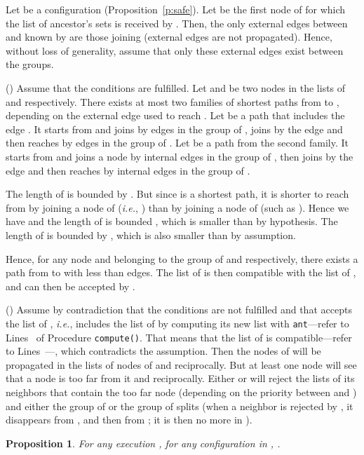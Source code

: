 \documentclass[11pt,english]{article}
\newcommand{\Latin}[1]{\textit{#1}}
\newcommand{\ie}{\Latin{i.e.},\xspace}
\newtheorem{proposition}{Proposition}
\newenvironment{proof}[1][0cm]{
  \begin{list}{\bf Proof.~}{
      \setlength{\itemindent}{0cm}
      \setlength{\labelsep}{0cm}
      \setlength{\labelwidth}{#1}
      \setlength{\leftmargin}{#1}
    \item
    }
}{\hfill
  \end{list}
}
\begin{document}
\begin{proof}
  Let  be a configuration (Proposition~\ref{p:safe}).
  Let  be the first node of  for which the list of ancestor's sets is
  received by . Then, the only external edges between  and 
  known by  are those joining  (external edges are not propagated). Hence,
  without loss of generality, assume that only these external edges exist
  between the groups.

  \noindent () Assume that the conditions are fulfilled.
Let  and  be two nodes in the lists of  and 
  respectively. There exists at most two families of shortest paths from  to
  , depending on the external edge used to reach .
Let  be a path that includes the edge . It starts from  and
  joins  by  edges in the group of , joins  by the edge  and
  then reaches  by  edges in the group of .
Let  be a path from the second family. It starts from  and joins a
  node  by  internal edges in the group of , then joins
   by the edge  and then reaches  by  internal edges in the
  group of .

  The length of  is bounded by .  But since  is a shortest
  path, it is shorter to reach  from  by joining a node of  (\ie
  ) than by joining a node of  (such as ). Hence we have  and the length of  is bounded , which is smaller than
   by hypothesis.
The length of  is bounded by , which is also smaller than
   by assumption.

  Hence, for any node  and  belonging to the group of  and 
  respectively, there exists a path from  to  with less than
   edges. The list of  is then compatible with the list of
  , and can then be accepted by .

  \noindent () Assume by contradiction that the conditions are not
  fulfilled and that  accepts the list of , \ie  includes the list of
   by computing its new list with \texttt{ant}---refer to Lines~ of
  Procedure \texttt{compute()}.  That means that the list of  is
  compatible---refer to Lines~---, which contradicts the assumption.  Then
  the nodes of  will be propagated in the lists of nodes of
   and reciprocally. But at least one node  will see that a node  is too
  far from it and reciprocally. Either  or  will reject the lists of its
  neighbors that contain the too far node (depending on the priority between 
  and ) and either the group of  or the group of  splits (when a
  neighbor is rejected by , it disappears from , and then
  from ; it is then no more in ).
\end{proof}

\begin{proposition}
  For any execution , for any configuration  in , .
\end{proposition}
\end{document}
